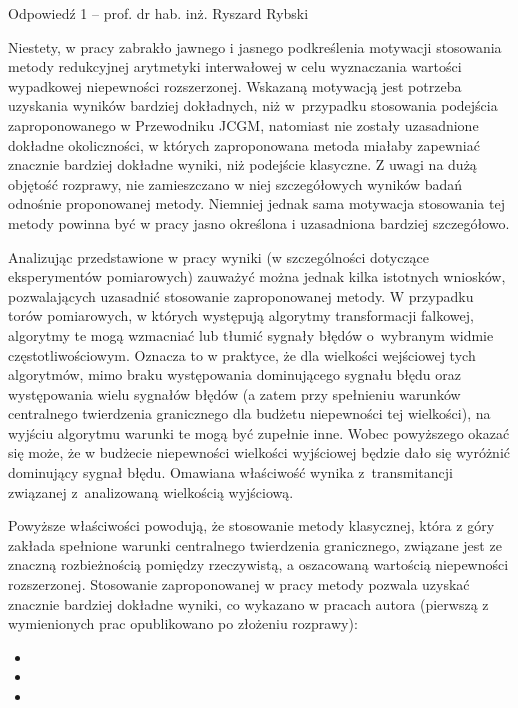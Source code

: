 \documentclass[12pt, polish, aspectratio = 169]{slides}
\begin{document}
\begin{frame}[allowframebreaks]{Odpowiedź 1 -- prof. dr hab. inż. Ryszard Rybski}\small
\begin{justify}
Niestety, w pracy zabrakło jawnego i jasnego podkreślenia motywacji stosowania metody redukcyjnej arytmetyki interwałowej w celu wyznaczania wartości wypadkowej niepewności rozszerzonej. Wskazaną motywacją jest potrzeba uzyskania wyników bardziej dokładnych, niż w przypadku stosowania podejścia zaproponowanego w Przewodniku JCGM, natomiast nie zostały uzasadnione dokładne okoliczności, w których zaproponowana metoda miałaby zapewniać znacznie bardziej dokładne wyniki, niż podejście klasyczne. Z uwagi na dużą objętość rozprawy, nie zamieszczano w niej szczegółowych wyników badań odnośnie proponowanej metody. Niemniej jednak sama motywacja stosowania tej metody powinna być w pracy jasno określona i uzasadniona bardziej szczegółowo.

Analizując przedstawione w pracy wyniki (w szczególności dotyczące eksperymentów pomiarowych) zauważyć można jednak kilka istotnych wniosków, pozwalających uzasadnić stosowanie zaproponowanej metody. W przypadku torów pomiarowych, w których występują algorytmy transformacji falkowej, algorytmy te mogą wzmacniać lub tłumić sygnały błędów o wybranym widmie częstotliwościowym. Oznacza to w praktyce, że dla wielkości wejściowej tych algorytmów, mimo braku występowania dominującego sygnału błędu oraz występowania wielu sygnałów błędów (a zatem przy spełnieniu warunków centralnego twierdzenia granicznego dla budżetu niepewności tej wielkości), na wyjściu algorytmu warunki te mogą być zupełnie inne. Wobec powyższego okazać się może, że w budżecie niepewności wielkości wyjściowej będzie dało się wyróżnić dominujący sygnał błędu. Omawiana właściwość wynika z transmitancji związanej z analizowaną wielkością wyjściową.

Powyższe właściwości powodują, że stosowanie metody klasycznej, która z góry zakłada spełnione warunki centralnego twierdzenia granicznego, związane jest ze znaczną rozbieżnością pomiędzy rzeczywistą, a oszacowaną wartością niepewności rozszerzonej. Stosowanie zaproponowanej w pracy metody pozwala uzyskać znacznie bardziej dokładne wyniki, co wykazano w pracach autora (pierwszą z wymienionych prac opublikowano po złożeniu rozprawy):

\begin{itemize}
\item {}
\item {}
\item {}
\end{itemize}
\end{justify}
\end{frame}
\end{document}
